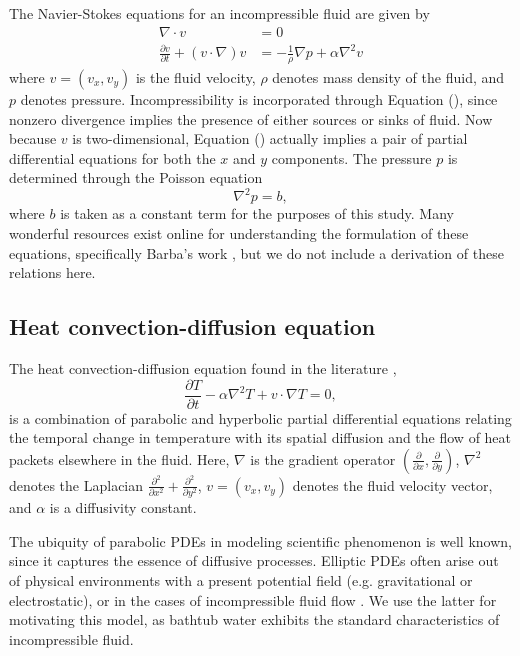 \documentclass[12pt]{article}
\begin{document}
The Navier-Stokes equations for an incompressible fluid are given by
\begin{align}
    \nabla \cdot v &= 0 \\
    \frac{\partial v}{\partial t} + (v \cdot \nabla) v &= -
    \frac{1}{\rho} \nabla p + \alpha \nabla^2 v
    \label{eq:\theequation}
\end{align}
where $v = (v_x, v_y)$ is the fluid velocity, $\rho$ denotes mass density of
the fluid, and $p$ denotes pressure. Incompressibility is incorporated
through Equation (), since nonzero divergence implies the presence of either
sources or sinks of fluid. Now because $v$ is two-dimensional, Equation
() actually implies a pair of partial differential equations for both the $x$
and $y$ components. The pressure $p$ is determined through the Poisson equation
\begin{equation}
    \nabla^2 p = b,
    \label{eq:\theequation}
\end{equation}
where $b$ is taken as a constant term for the purposes of this study. Many
wonderful resources exist online for understanding the formulation of these
equations, specifically Barba's work \cite{12-steps}, but we do not include a
derivation of these relations here.

\subsection{Heat convection-diffusion equation}

The heat convection-diffusion equation found in the literature
\cite{convection-diffusion},
\begin{equation}
    \frac{\partial T}{\partial t} - \alpha \nabla^2 T + v \cdot \nabla T =
    0,
    \label{eq:\theequation}
\end{equation}
is a combination of parabolic and hyperbolic partial differential equations
relating the temporal change in temperature with its spatial diffusion and
the flow of heat packets elsewhere in the fluid.     Here, $\nabla$ is the
gradient operator $\left( \frac{\partial}{\partial x},
\frac{\partial}{\partial y} \right)$, $\nabla^2$ denotes the Laplacian
$\frac{\partial^2}{\partial x^2} + \frac{\partial^2}{\partial y^2}$, $v =
(v_x, v_y)$ denotes the fluid velocity vector, and $\alpha$ is a diffusivity
constant.

The ubiquity of parabolic PDEs in modeling scientific phenomenon is well
known, since it captures the essence of diffusive processes. Elliptic PDEs
often arise out of physical environments with a present potential field
(e.g.  gravitational or electrostatic), or in the cases of incompressible
fluid flow \cite{convection-diffusion, ames}. We use the latter for
motivating this model, as bathtub water exhibits the standard
characteristics of incompressible fluid.
\end{document}
